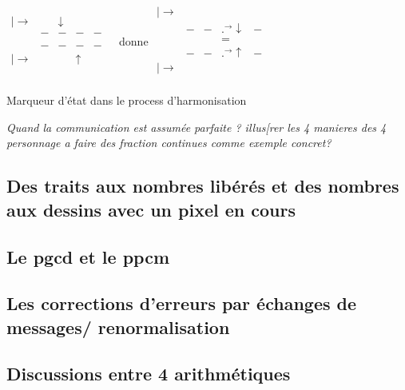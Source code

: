 \documentclass{article}
\begin{document}
$
\begin{matrix}
| \longrightarrow&&\downarrow&&\\
                  &-&-&-&- \\
                  &&&&\\
                   &-&-&-&- \\
| \rightarrow&&&\uparrow&&\\                
\end{matrix}
$
donne 
$
\begin{matrix}
| \longrightarrow&&&&\\
                  &-&-&.^{\longrightarrow} \downarrow &- \\
                  & & &=& \\
                   &-&-&.^\rightarrow \uparrow            &- \\
| \rightarrow& & &&&\\                
\end{matrix}
$ 

Marqueur d'état dans le process d'harmonisation 



\emph{Quand la communication est assumée parfaite ? illus[rer les 4 manieres des 4 personnage a faire des fraction continues comme exemple concret?}

 


\subsection{Des traits aux nombres libérés et des nombres aux dessins avec un pixel en cours}
\subsection{Le pgcd et le ppcm }
\subsection{Les corrections d'erreurs par échanges de messages/ renormalisation}
\subsection{Discussions entre 4 arithmétiques}
\end{document}
